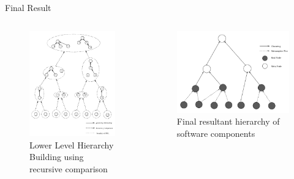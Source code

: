 \documentclass{beamer}
\begin{document}
\begin{frame}{Final Result}
	\begin{columns}
		\begin{column}{0.5\textwidth}

			\begin{figure}
				\includegraphics[scale=0.3]{lowerLevelHierarchy.png}
				\caption{Lower Level Hierarchy Building using recursive comparison\cite{formal}}
				
			\end{figure}

		\end{column}
		\begin{column}{0.5\textwidth}

			\begin{figure}
					\includegraphics[scale=0.3]{finalHierarchy.png}
				\caption{Final resultant hierarchy of software components\cite{formal}}
				

\end{figure}
\end{column}
\end{columns}
\end{frame}
\end{document}
